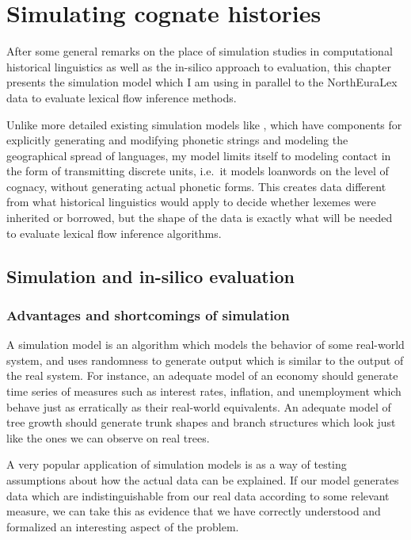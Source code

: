 \chapter{Simulating cognate histories}\label{sec:5}
After some general remarks on the place of simulation studies in computational historical linguistics as well as the in-silico approach to evaluation, this chapter presents the simulation model which I am using in parallel to the NorthEuraLex data to evaluate lexical flow inference methods.

Unlike more detailed existing simulation models like \cite{hochmuth_ea_2008}, which have components for explicitly generating and modifying phonetic strings and modeling the geographical spread of languages, my model limits itself to modeling contact in the form of transmitting discrete units, i.e.\ it models loanwords on the level of cognacy, without generating actual phonetic forms. This creates data different from what historical linguistics would apply to decide whether lexemes were inherited or borrowed, but the shape of the data is exactly what will be needed to evaluate lexical flow inference algorithms. 

\section{Simulation and in-silico evaluation}

\subsection{Advantages and shortcomings of simulation}
A simulation model is an algorithm which models the behavior of some real-world system, and uses randomness to generate output which is similar to the output of the real system. For instance, an adequate model of an economy should generate time series of measures such as interest rates, inflation, and unemployment which behave just as erratically as their real-world equivalents. An adequate model of tree growth should generate trunk shapes and branch structures which look just like the ones we can observe on real trees.

A very popular application of simulation models is as a way of testing assumptions about how the actual data can be explained. If our model generates data which are indistinguishable from our real data according to some relevant measure, we can take this as evidence that we have correctly understood and formalized an interesting aspect of the problem.

